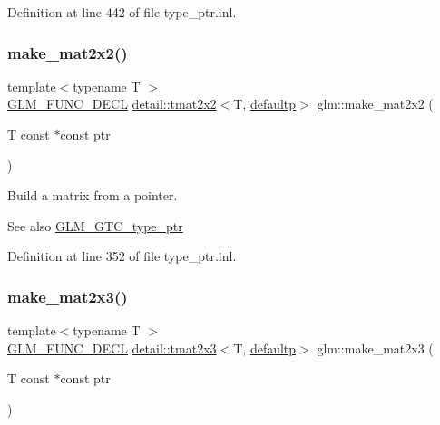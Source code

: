 Definition at line 442 of file type\+\_\+ptr.\+inl.

\mbox{\label{group__gtc__type__ptr_ga860d529f631ea6f9a0e510491d29a8ac}} 
\subsubsection{\texorpdfstring{make\+\_\+mat2x2()}{make\_mat2x2()}}
{\footnotesize\ttfamily template$<$typename T $>$ \\
\hyperlink{setup_8hpp_ab2d052de21a70539923e9bcbf6e83a51}{G\+L\+M\+\_\+\+F\+U\+N\+C\+\_\+\+D\+E\+CL} \hyperlink{structglm_1_1detail_1_1tmat2x2}{detail\+::tmat2x2}$<$T, \hyperlink{namespaceglm_a0f04f086094c747d227af4425893f545a9d21ccd8b5a009ec7eb7677befc3bf51}{defaultp}$>$ glm\+::make\+\_\+mat2x2 (\begin{DoxyParamCaption}\item[{T const $\ast$const}]{ptr }\end{DoxyParamCaption})}

Build a matrix from a pointer. \begin{DoxySeeAlso}{See also}
\hyperlink{group__gtc__type__ptr}{G\+L\+M\+\_\+\+G\+T\+C\+\_\+type\+\_\+ptr} 
\end{DoxySeeAlso}


Definition at line 352 of file type\+\_\+ptr.\+inl.

\mbox{\label{group__gtc__type__ptr_gadef48cd950566f23a4b1e47127ee478c}} 
\subsubsection{\texorpdfstring{make\+\_\+mat2x3()}{make\_mat2x3()}}
{\footnotesize\ttfamily template$<$typename T $>$ \\
\hyperlink{setup_8hpp_ab2d052de21a70539923e9bcbf6e83a51}{G\+L\+M\+\_\+\+F\+U\+N\+C\+\_\+\+D\+E\+CL} \hyperlink{structglm_1_1detail_1_1tmat2x3}{detail\+::tmat2x3}$<$T, \hyperlink{namespaceglm_a0f04f086094c747d227af4425893f545a9d21ccd8b5a009ec7eb7677befc3bf51}{defaultp}$>$ glm\+::make\+\_\+mat2x3 (\begin{DoxyParamCaption}\item[{T const $\ast$const}]{ptr }\end{DoxyParamCaption})}

